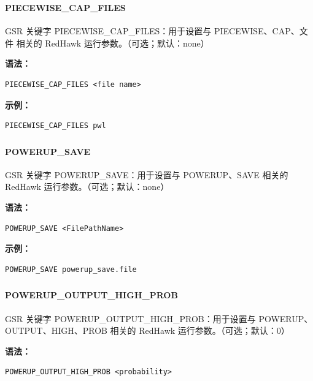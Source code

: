 \subsubsection{}
\paragraph*{PIECEWISE_CAP_FILES}

GSR 关键字 PIECEWISE_CAP_FILES：用于设置与 PIECEWISE、CAP、文件 相关的 RedHawk 运行参数。（可选；默认：none）

\textbf{语法：}
\begin{lstlisting}
PIECEWISE_CAP_FILES <file name>
\end{lstlisting}

\textbf{示例：}
\begin{lstlisting}
PIECEWISE_CAP_FILES pwl
\end{lstlisting}

\subsubsection{}
\paragraph*{POWERUP_SAVE}

GSR 关键字 POWERUP_SAVE：用于设置与 POWERUP、SAVE 相关的 RedHawk 运行参数。（可选；默认：none）

\textbf{语法：}
\begin{lstlisting}
POWERUP_SAVE <FilePathName>
\end{lstlisting}

\textbf{示例：}
\begin{lstlisting}
POWERUP_SAVE powerup_save.file
\end{lstlisting}

\subsubsection{}
\paragraph*{POWERUP_OUTPUT_HIGH_PROB}

GSR 关键字 POWERUP_OUTPUT_HIGH_PROB：用于设置与 POWERUP、OUTPUT、HIGH、PROB 相关的 RedHawk 运行参数。（可选；默认：0）

\textbf{语法：}
\begin{lstlisting}
POWERUP_OUTPUT_HIGH_PROB <probability>
\end{lstlisting}

